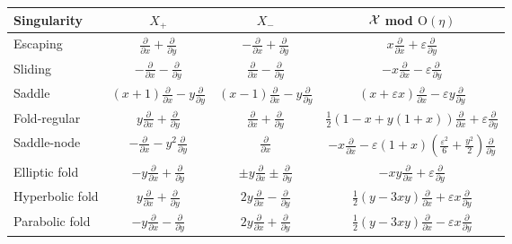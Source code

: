 \documentclass[11pt,psamsfonts]{article}
\theoremstyle{definition}
\theoremstyle{remark}
\newcommand{\eps}{\varepsilon }
\newcommand{\e}{\eps }
\begin{document}
\begin{table}[htb!]
\begin{tabular}{l|ccc}
Singularity & $X_+$ & $X_-$ & $\cal X$ mod $\mathrm{O}(\eta)$  \\
\hline
Escaping & $\frac{\partial}{\partial x} + \frac{\partial}{\partial y}$ & $-\frac{\partial}{\partial x} + \frac{\partial}{\partial y}$ 
& $x \frac{\partial}{\partial x}+ \eps\frac{\partial}{\partial y}$   \\
Sliding    &  $-\frac{\partial}{\partial x} - \frac{\partial}{\partial y}$  &    $\frac{\partial}{\partial x} - \frac{\partial}{\partial y}$    
&   $-x\frac{\partial}{\partial x}-\eps \frac{\partial}{\partial y}$  \\
Saddle&    $(x+1)\frac{\partial}{\partial x} - y\frac{\partial}{\partial y}$      &   $(x-1)\frac{\partial}{\partial x} - y\frac{\partial}{\partial y}$     
&   $\left( x + \e x \right)\frac{\partial}{\partial x }-\eps y\frac{\partial}{\partial y}$                                         \\
 Fold-regular    &   $y\frac{\partial}{\partial x} + \frac{\partial}{\partial y}$    &  $\frac{\partial}{\partial x} + \frac{\partial}{\partial y}$    
 &  $\frac{1}{2}\left(1-x + y(1+x)\right)\frac{\partial}{\partial x }+\eps \frac{\partial}{\partial y}$  \\
 Saddle-node    &   $-\frac{\partial}{\partial x} - y^2\frac{\partial}{\partial y}$    &  $\frac{\partial}{\partial x}$    
 &  $-x\frac{\partial}{\partial x }-\eps(1 +  x ) (\frac{\eps^2}{6}+\frac{y^2}{2})\frac{\partial}{\partial y}$  \\
 Elliptic fold    &   $-y\frac{\partial}{\partial x} + \frac{\partial}{\partial y}$    &  $\pm y\frac{\partial}{\partial x} \pm \frac{\partial}{\partial y}$    
 &  $-x y\frac{\partial}{\partial x }+\eps \frac{\partial}{\partial y}$  \\
 Hyperbolic fold    &   $y\frac{\partial}{\partial x} + \frac{\partial}{\partial y}$    &  $2y\frac{\partial}{\partial x} - \frac{\partial}{\partial y}$    
 &  $\frac{1}{2}(y - 3  x  y)\frac{\partial}{\partial x }+\eps x\frac{\partial}{\partial y}$  \\
Parabolic fold    &   $ -y\frac{\partial}{\partial x} - \frac{\partial}{\partial y}$    &  $2y\frac{\partial}{\partial x} + \frac{\partial}{\partial y}$    
&  $\frac{1}{2} (y - 3 x  y)\frac{\partial}{\partial x }- \eps x \frac{\partial}{\partial y}$                                                         
\end{tabular}
\end{table}
\end{document}
